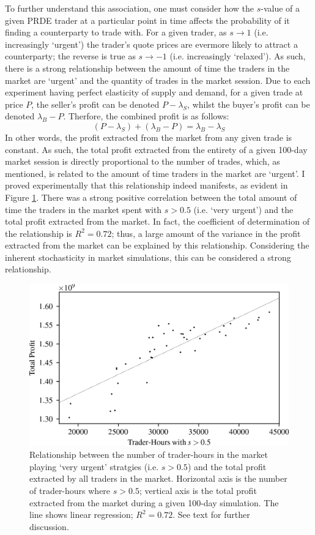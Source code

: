 \documentclass[conference]{IEEEtran}
\begin{document}
To further understand this association, one must consider how the $s$-value of a given PRDE trader at a particular point in time affects the probability of it finding a counterparty to trade with.
For a given trader, as $s\to1$ (i.e. increasingly `urgent') the trader's quote prices are evermore likely to attract a counterparty; the reverse is true as $s\to-1$ (i.e. increasingly `relaxed').
As such, there is a strong relationship between the amount of time the traders in the market are `urgent' and the quantity of trades in the market session.
Due to each experiment having perfect elasticity of supply and demand, for a given trade at price $P$, the seller's profit can be denoted $P-\lambda_S$, whilst the buyer's profit can be denoted $\lambda_B-P$.
Therfore, the combined profit is as follows:
\[
  (P-\lambda_S) + (\lambda_B-P)=\lambda_B-\lambda_S
\]
In other words, the profit extracted from the market from any given trade is constant.
As such, the total profit extracted from the entirety of a given 100-day market session is directly proportional to the number of trades, which, as mentioned, is related to the amount of time traders in the market are `urgent'.
I proved experimentally that this relationship indeed manifests, as evident in Figure \ref{strategy_profit}.
There was a strong positive correlation between the total amount of time the traders in the market spent with $s>0.5$ (i.e. `very urgent') and the total profit extracted from the market.
In fact, the coefficient of determination of the relationship is $R^2=0.72$; thus, a large amount of the variance in the profit extracted from the market can be explained by this relationship.
Considering the inherent stochasticity in market simulations, this can be considered a strong relationship.

\begin{figure}[htbp]
    \centerline{\includegraphics[width=\columnwidth]{strategy_profit.png}}
    \caption{
        Relationship between the number of trader-hours in the market playing `very urgent' stratgies (i.e. $s>0.5$) and the total profit extracted by all traders in the market.
        Horizontal axis is the number of trader-hours where $s>0.5$; vertical axis is the total profit extracted from the market during a given 100-day simulation.
        The line shows linear regression; $R^2=0.72$.
        See text for further discussion.
    }
    \label{strategy_profit}
\end{figure}
\end{document}
